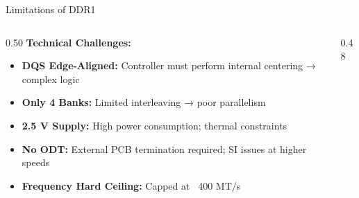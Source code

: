 \documentclass[aspectratio=169]{beamer}
\begin{document}
\begin{frame}{Limitations of DDR1}
  \begin{columns}[T]
    \begin{column}{0.50\textwidth}
      \textbf{Technical Challenges:}
      \begin{itemize}
        \setlength\itemsep{8pt}
        \item \textbf{DQS Edge-Aligned:} Controller must perform internal centering → complex logic
        \item \textbf{Only 4 Banks:} Limited interleaving → poor parallelism
        \item \textbf{2.5 V Supply:} High power consumption; thermal constraints
        \item \textbf{No ODT:} External PCB termination required; SI issues at higher speeds
        \item \textbf{Frequency Hard Ceiling:} Capped at ~400 MT/s
      \end{itemize}
    \end{column}
    \begin{column}{0.48\textwidth}
      \vspace{0.2cm}
    \end{column}
  \end{columns}
\end{frame}
\end{document}
